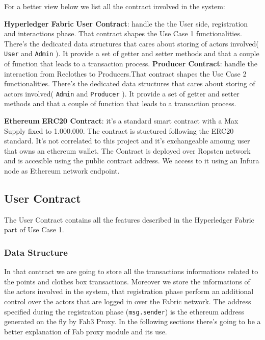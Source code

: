 For a better view below we list all the contract involved in the system:
\begin{outline}[enumerate]
    \1 \textbf{Hyperledger Fabric}
    \2 \textbf{User Contract}: handle the the User side, registration and interactions phase. That contract
    shapes the Use Case 1 functionalities. There's the dedicated data structures that cares about storing of actors
    involved( \texttt{User} and \texttt{Admin} ). It provide a set of getter and setter methods and that 
    a couple of function that leads to a transaction process.    
    \2 \textbf{Producer Contract}: handle the interaction from Reclothes to Producers.That contract
    shapes the Use Case 2 functionalities. There's the dedicated data structures that cares about storing of actors
    involved( \texttt{Admin} and \texttt{Producer} ). It provide a set of getter and setter methods and 
    that a couple of function that leads to a transaction process.  

    \1 \textbf{Ethereum}
    \2 \textbf{ERC20 Contract}: it's a standard smart contract with a Max Supply fixed to 1.000.000.
    The contract is stuctured following the ERC20 standard. It's not correlated to this project and
    it's exchangeable amoung user that owns an ethereum wallet. The Contract is deployed over Ropsten network 
    and is accesible using the public contract address. We access to it using an Infura node as Ethereum network endpoint.
\end{outline}

\subsection{User Contract} 

The User Contract contains all the features described in the Hyperledger Fabric part of Use Case 1. 

\subsubsection{Data Structure}

In that contract we are going to store all the transactions informations related to the points and 
clothes box transactions. Moreover we store the informations of the actors involved in the system, that registration 
phase perform an additional control over the actors that are logged in over the Fabric network. The
address specified during the registration phase (\texttt{msg.sender}) is the ethereum address
generated on the fly by Fab3 Proxy. In the following sections there's going to be a better
explanation of Fab proxy module and its use.  
\bigskip

